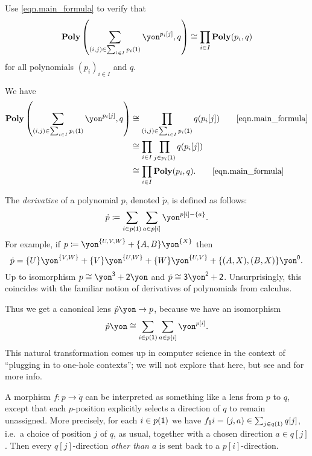 \documentclass[Book-Poly]{subfiles}
\begin{document}
\begin{exercise}%
Use \eqref{eqn.main_formula} to verify that
\[
    \poly\left(\sum_{(i,j)\in\sum_{i\in I}p_i(\1)}\yon^{p_i[j]}, q\right) \iso \prod_{i \in I}\poly(p_i, q)
\]
for all polynomials $(p_i)_{i\in I}$ and $q$.
\begin{solution}
We have
\begin{align*}
    \poly\left(\sum_{(i,j) \in \sum_{i \in I} p_i(\1)} \yon^{p_i[j]}, q\right) &\iso \prod_{(i,j) \in \sum_{i \in I} p_i(\1)} q(p_i[j])
    \tag*{\eqref{eqn.main_formula}} \\
    &\iso \prod_{i \in I} \prod_{j \in p_i(\1)} q(p_i[j]) \\
    &\iso \prod_{i \in I} \poly(p_i, q).
    \tag*{\eqref{eqn.main_formula}}
\end{align*}
\end{solution}
\end{exercise}


\begin{example}[Derivatives]\label{ex.derivatives}
The \emph{derivative} of a polynomial $p$, denoted $\dot{p}$, is defined as follows:
\[
\dot{p}\coloneqq\sum_{i\in p(\1)}\sum_{a\in p[i]}\yon^{p[i]-\{a\}}.
\]
For example, if $p\coloneq\yon^{\{U,V,W\}}+\{A,B\}\yon^{\{X\}}$ then
\[\dot{p}=\{U\}\yon^{\{V,W\}}+\{V\}\yon^{\{U,W\}}+\{W\}\yon^{\{U,V\}}+\{(A,X),(B,X)\}\yon^\0.\]
Up to isomorphism $p\cong\yon^\3+\2\yon$ and $\dot{p}\cong\3\yon^\2+\2$.
Unsurprisingly, this coincides with the familiar notion of derivatives of polynomials from calculus.

Thus we get a canonical lens $\dot{p}\yon\to p$, because we have an isomorphism
\[
\dot{p}\yon\cong\sum_{i\in p(\1)}\sum_{a\in p[i]}\yon^{p[i]}.
\]
This natural transformation comes up in computer science in the context of ``plugging in to one-hole contexts''; we will not explore that here, but see \cite{mcbride2001derivative} and \cite{abbott2003derivatives} for more info.%

A morphism $f\colon p\to \dot{q}$ can be interpreted as something like a lens from $p$ to $q$, except that each $p$-position explicitly selects a direction of $q$ to remain unassigned. More precisely, for each $i\in p(\textsf{1})$ we have $f_{\textsf{1}}i=(j,a)\in \sum_{j\in q(\textsf{1})}q[j]$, i.e.\ a choice of position $j$ of $q$, as usual, together with a chosen direction $a\in q[j]$. Then every $q[j]$-direction \emph{other than $a$} is sent back to a $p[i]$-direction.
\end{example}
\end{document}
